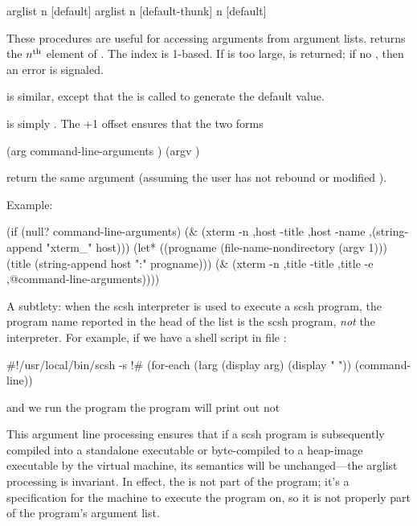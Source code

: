   {arglist n [default]} \str
{} {arglist n [default-thunk]} \str
{} {n [default]} \str
\begin{desc}
These procedures are useful for accessing arguments from argument
lists.
 returns the $n^{\rm{th}}$ element of .
The index is 1-based.
If  is too large,  is returned; 
if no , then an error is signaled.

 is similar, except that the  is called to generate
the default value.

 is simply . 
The +1 offset ensures that the two forms
%
\begin{code}
(arg command-line-arguments )
(argv )\end{code}
%
return the same argument
(assuming the user has not rebound or modified ).

Example:
%
\begin{code}
(if (null? command-line-arguments)
    (& (xterm -n ,host -title ,host
              -name ,(string-append "xterm_" host)))
    (let* ((progname (file-name-nondirectory (argv 1)))
           (title (string-append host ":" progname)))
      (& (xterm -n     ,title
                -title ,title
                -e     ,@command-line-arguments))))\end{code}
%
A subtlety: when the scsh interpreter is used to execute a scsh program,
the program name reported in the head of the  list
is the scsh program, {\em not} the interpreter.
For example, if we have a shell script in file :
\begin{code}
#!/usr/local/bin/scsh -s
!#
(for-each (\l{arg} (display arg) (display " "))
          (command-line))\end{code}
and we run the program
the program will print out
not

This argument line processing ensures that if a scsh program is subsequently
compiled into a standalone executable or byte-compiled to a heap-image
executable by the {\scm} virtual machine, its semantics will be
unchanged---the arglist processing is invariant. In effect, the
is not part of the program; 
it's a specification for the machine to execute the program on, so it is
not properly part of the program's argument list.

\end{desc}

